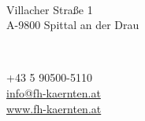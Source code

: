 \begin{titlepage}

\begin{minipage}{0.45\textwidth}
\sffamily
\raggedright
\footnotesize
\sodef{}
	 \\
\vspace{0.1cm}	
Villacher Straße 1\\
A-9800 Spittal an der Drau\\

\end{minipage}
\raggedleft
\hfill
\begin{minipage}{0.45\textwidth}
\raggedleft	

\end{minipage}
\vspace{0.1cm}\\	
\raggedright
\begin{minipage}{0.65\textwidth}
\sffamily
\raggedright
\footnotesize
+43 5 90500-5110\\
\href{mailto:info@fh-kaernten.at}{info@fh-kaernten.at}\\
\href{http://www.fh-kaernten.at}{www.fh-kaernten.at}\\
\end{minipage}

\vspace{2,95cm}


\end{titlepage}
